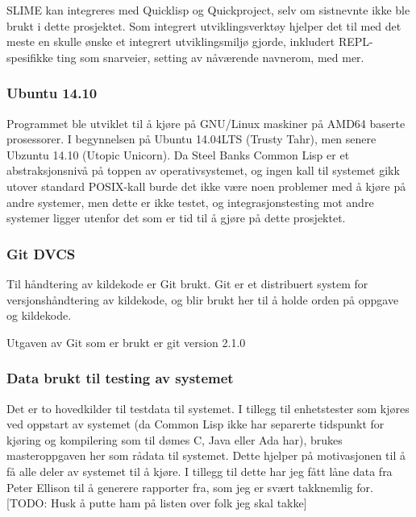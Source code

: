 \documentclass[11pt]{article}
\begin{document}
SLIME kan integreres med Quicklisp og Quickproject, selv om sistnevnte ikke ble brukt i dette prosjektet.
Som integrert utviklingsverktøy hjelper det til med det meste en skulle ønske et integrert utviklingsmiljø gjorde, inkludert REPL-spesifikke ting som snarveier, setting av nåværende navnerom, med mer.



\subsubsection{Ubuntu 14.10}



Programmet ble utviklet til å kjøre på GNU/Linux maskiner på AMD64 baserte prosessorer. I begynnelsen på Ubuntu 14.04LTS (Trusty Tahr), men senere Ubzuntu 14.10 (Utopic Unicorn). Da Steel Banks Common Lisp er et abstraksjonsnivå på toppen av operativsystemet, og ingen kall til systemet gikk utover standard POSIX-kall burde det ikke være noen problemer med å kjøre på andre systemer, men dette er ikke testet, og integrasjonstesting mot andre systemer ligger utenfor det som er tid til å gjøre på dette prosjektet.



\subsubsection{Git DVCS}



Til håndtering av kildekode er Git brukt.
Git er et distribuert system for versjonshåndtering av kildekode, og blir brukt her til å holde orden på oppgave og kildekode.



Utgaven av Git som er brukt er git version 2.1.0



\subsubsection{Data brukt til testing av systemet}



Det er to hovedkilder til testdata til systemet. I tillegg til enhetstester som kjøres ved oppstart av systemet (da Common Lisp ikke har separerte tidspunkt for kjøring og kompilering som til dømes C, Java eller Ada har), brukes masteroppgaven her som rådata til systemet. Dette hjelper på motivasjonen til å få alle deler av systemet til å kjøre. I tillegg til dette har jeg fått låne data fra Peter Ellison til å generere rapporter fra, som jeg er svært takknemlig for. [TODO: Husk å putte ham på listen over folk jeg skal takke]
\end{document}

